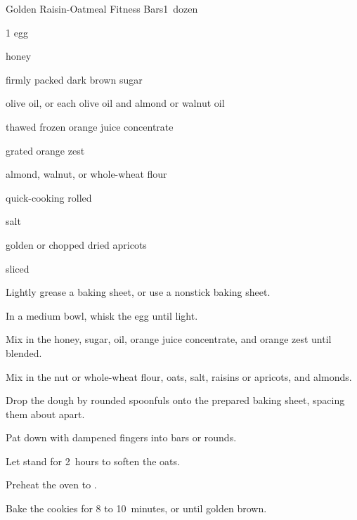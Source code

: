 \begin{recipe}{Golden Raisin-Oatmeal Fitness Bars}{}{1\half\ dozen}

\begin{ingredients}
\item 1 egg
\item \C{\quarter} honey
\item \C{\quarter} firmly packed dark brown sugar
\item \C{\quarter} olive oil, or  each olive oil and almond or walnut oil
\item \C{\quarter} thawed frozen orange juice concentrate
\item {} grated orange zest
\item \C{\quarter} almond, walnut, or whole-wheat flour
\item {} quick-cooking rolled 
\item \tp{\quarter} salt
\item \C{\half} golden  or chopped dried apricots
\item \C{\quarter} sliced 
\end{ingredients}

\begin{directions}
\item Lightly grease a baking sheet, or use a nonstick baking sheet.
\item In a medium bowl, whisk the egg until light.
\item Mix in the honey, sugar, oil, orange juice concentrate, and orange zest until blended.
\item Mix in the nut or whole-wheat flour, oats, salt, raisins or apricots, and almonds.
\item Drop the dough by rounded spoonfuls onto the prepared baking sheet, spacing them about \inch{\threequarter} apart.
\item Pat down with dampened fingers into bars or rounds.
\item Let stand for 2~hours to soften the oats.
\item Preheat the oven to .
\item Bake the cookies for 8 to 10~minutes, or until golden brown.
\end{directions}

\end{recipe}
